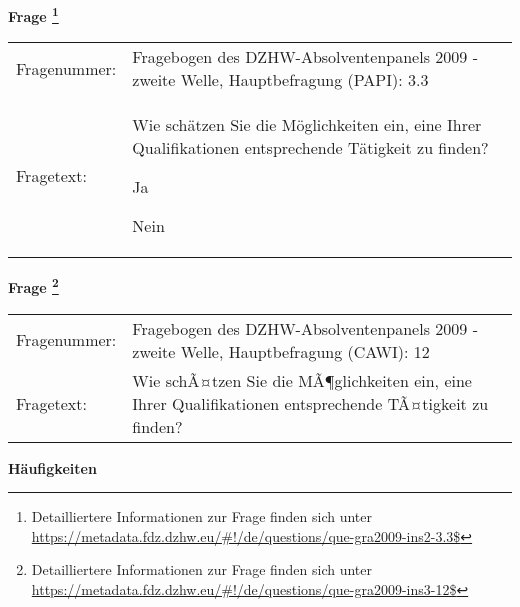 				\vspace*{0.5cm}
                \noindent\textbf{Frage
	                \footnote{Detailliertere Informationen zur Frage finden sich unter
		              \url{https://metadata.fdz.dzhw.eu/\#!/de/questions/que-gra2009-ins2-3.3$}}}\\
				\begin{tabularx}{\hsize}{@{}lX}
					Fragenummer: &
					  Fragebogen des DZHW-Absolventenpanels 2009 - zweite Welle, Hauptbefragung (PAPI):
					  3.3
 \\
					Fragetext: & Wie schätzen Sie die Möglichkeiten ein, eine Ihrer Qualifikationen entsprechende Tätigkeit zu finden?\par  Ja\par  Nein \\
				\end{tabularx}
				\vspace*{0.5cm}
                \noindent\textbf{Frage
	                \footnote{Detailliertere Informationen zur Frage finden sich unter
		              \url{https://metadata.fdz.dzhw.eu/\#!/de/questions/que-gra2009-ins3-12$}}}\\
				\begin{tabularx}{\hsize}{@{}lX}
					Fragenummer: &
					  Fragebogen des DZHW-Absolventenpanels 2009 - zweite Welle, Hauptbefragung (CAWI):
					  12
 \\
					Fragetext: & Wie schÃ¤tzen Sie die MÃ¶glichkeiten ein, eine Ihrer Qualifikationen entsprechende TÃ¤tigkeit zu finden? \\
				\end{tabularx}





        		\vspace*{0.5cm}
                \noindent\textbf{Häufigkeiten}

